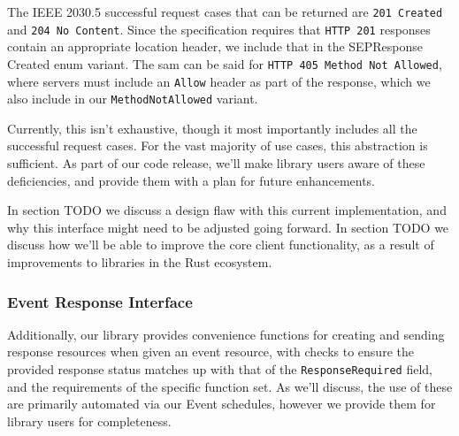 The IEEE 2030.5 successful request cases that can be returned are \texttt{201 Created} and \texttt{204 No Content}. Since the specification requires that \texttt{HTTP 201} responses contain an appropriate location header, we include that in the SEPResponse Created enum variant. The sam can be said for \texttt{HTTP 405 Method Not Allowed}, where servers must include an \texttt{Allow} header as part of the response, which we also include in our \texttt{MethodNotAllowed} variant.

Currently, this isn't exhaustive, though it most importantly includes all the successful request cases. For the vast majority of use cases, this abstraction is sufficient. As part of our code release, we'll make library users aware of these deficiencies, and provide them with a plan for future enhancements.

In section TODO we discuss a design flaw with this current implementation, and why this interface might need to be adjusted going forward. In section TODO we discuss how we'll be able to improve the core client functionality, as a result of improvements to libraries in the Rust ecosystem.

\subsubsection{Event Response Interface}

Additionally, our library provides convenience functions for creating and sending response resources when given an event resource, with checks to ensure the provided response status matches up with that of the \texttt{ResponseRequired} field, and the requirements of the specific function set.  As we'll discuss, the use of these are primarily automated via our Event schedules, however we provide them for library users for completeness.


